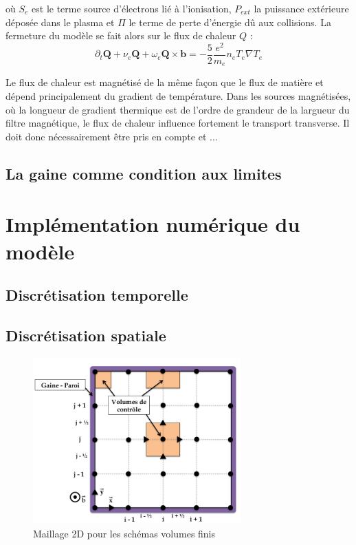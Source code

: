 où $S_e$ est le terme source d'électrons lié à l'ionisation, $P_{ext}$ la puissance extérieure déposée dans le plasma
 et $\Pi$ le terme de perte d'énergie dû aux collisions. La fermeture du modèle se fait alors sur le flux de chaleur $Q$ 
 \cite{Golant} :
\begin{equation}
	\partial_t \mathbf{Q} + \nu_e\mathbf{Q}+\omega_e\mathbf{Q}\times\mathbf{b} = -\frac{5}{2}\frac{e^2}{m_e}n_eT_e\nabla T_e
\end{equation}

Le flux de chaleur est magnétisé de la même façon que le flux de matière et dépend principalement 
du gradient de température. Dans les sources magnétisées, où la longueur de gradient thermique est de 
l'ordre de grandeur de la largueur du filtre magnétique, le flux de chaleur influence fortement le transport
transverse. Il doit donc nécessairement être pris en compte et ... 
\subsection{La gaine comme condition aux limites}

\section{Implémentation numérique du modèle}
\subsection{Discrétisation temporelle}
\subsection{Discrétisation spatiale}
\begin{figure}[htbp]
	\centering
	\includegraphics[height=64mm,width=80mm]{figures/grid.png}
	{\caption{Maillage 2D pour les schémas volumes finis}
	\label{maillage}}
\end{figure}
